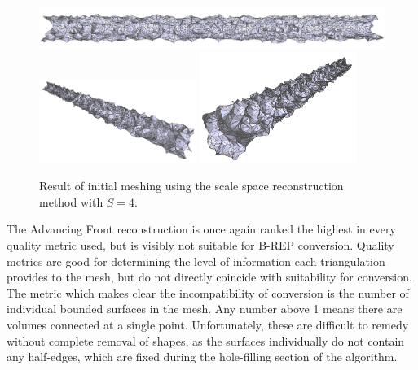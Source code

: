 \documentclass[12pt]{drexelthesis}
\begin{document}
\begin{figure}[!ht]
	
	\centering
		\includegraphics[width=5in]{simulated-lab-scan/2cmnoise/2cmmeshNeat/scalespace400.png}
		\includegraphics[width=2in]{simulated-lab-scan/2cmnoise/2cmmeshNeat/scalespace401.png}
		\includegraphics[width=2in]{simulated-lab-scan/2cmnoise/2cmmeshNeat/scalespace402.png}
		\caption[Initial meshing using a scale space reconstruction with $S = 4$]{\centering  Result of initial meshing using the scale space reconstruction method with $S = 4$.}
		\label{2cmnoise:scalespace4}
\end{figure}

The Advancing Front reconstruction is once again ranked the highest in every quality metric used, but is visibly not suitable for B-REP conversion. Quality metrics are good for determining the level of information each triangulation provides to the mesh, but do not directly coincide with suitability for conversion. The metric which makes clear the incompatibility of conversion is the number of individual bounded surfaces in the mesh. Any number above 1 means there are volumes connected at a single point. Unfortunately, these are difficult to remedy without complete removal of shapes, as the surfaces individually do not contain any half-edges, which are fixed during the hole-filling section of the algorithm.
\end{document}
